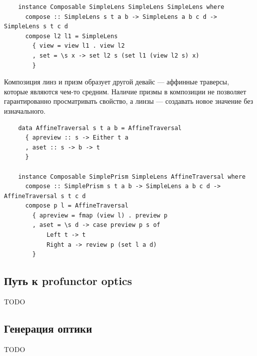 \begin{verbatim}
    instance Composable SimpleLens SimpleLens SimpleLens where
      compose :: SimpleLens s t a b -> SimpleLens a b c d -> SimpleLens s t c d
      compose l2 l1 = SimpleLens
        { view = view l1 . view l2
        , set = \s x -> set l2 s (set l1 (view l2 s) x)
        }
\end{verbatim}

Композиция линз и призм образует другой девайс --- аффинные траверсы, которые являются чем-то средним.
Наличие призмы в композиции не позволяет гарантированно просматривать свойство, а линзы --- создавать новое значение без изначального.
\begin{verbatim}
    data AffineTraversal s t a b = AffineTraversal
      { apreview :: s -> Either t a
      , aset :: s -> b -> t
      }

    instance Composable SimplePrism SimpleLens AffineTraversal where
      compose :: SimplePrism s t a b -> SimpleLens a b c d -> AffineTraversal s t c d
      compose p l = AffineTraversal
        { apreview = fmap (view l) . preview p
        , aset = \s d -> case preview p s of
            Left t -> t
            Right a -> review p (set l a d)
        }
\end{verbatim}

\subsection{Путь к profunctor optics}

TODO %

\subsection{Генерация оптики}

TODO %


















%


